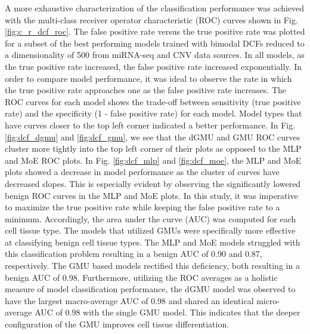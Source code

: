 A more exhaustive characterization of the classification performance was achieved with the multi-class receiver operator characteristic (ROC) curves shown in Fig. \ref{fig:c_r_dcf_roc}. The false positive rate versus the true positive rate was plotted for a subset of the best performing models trained with bimodal DCFs reduced to a dimensionality of 500 from miRNA-seq and CNV data sources. In all models, as the true positive rate increased, the false positive rate increased exponentially. In order to compare model performance, it was ideal to observe the rate in which the true positive rate approaches one as the false positive rate increases. The ROC curves for each model shows the trade-off between sensitivity (true positive rate) and the specificity (1 - false positive rate) for each model. Model types that have curves closer to the top left corner indicated a better performance. In Fig. \ref{fig:dcf_dgmu} and \ref{fig:dcf_gmu}, we see that the dGMU and GMU ROC curves cluster more tightly into the top left corner of their plots as opposed to the MLP and MoE ROC plots. In Fig. \ref{fig:dcf_mlp} and \ref{fig:dcf_moe}, the MLP and MoE plots showed a decrease in model performance as the cluster of curves have decreased slopes. This is especially evident by observing the significantly lowered benign ROC curves in the MLP and MoE plots. In this study, it was imperative to maximize the true positive rate while keeping the false positive rate to a minimum. Accordingly, the area under the curve (AUC) was computed for each cell tissue type. The models that utilized GMUs were specifically more effective at classifying benign cell tissue types. The MLP and MoE models struggled with this classification problem resulting in a benign AUC of 0.90 and 0.87, respectively. The GMU based models rectified this deficiency, both resulting in a benign AUC of 0.98. Furthermore, utilizing the ROC averages as a holistic measure of model classification performance, the dGMU model was observed to have the largest macro-average AUC of 0.98 and shared an identical micro-average AUC of 0.98 with the single GMU model. This indicates that the deeper configuration of the GMU improves cell tissue differentiation.

